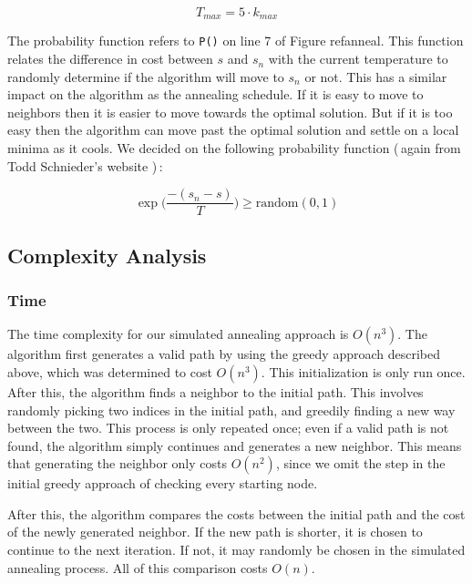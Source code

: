 \documentclass{article}
\def\code#1{\texttt{#1}}
\def\bigO#1{$O(#1)$}
\begin{document}
\begin{multicols}{2}
        \begin{equation}
            T_{max} = 5\cdot k_{max}
        \end{equation}

        The probability function refers to \code{P()} on line 7 of Figure ref{anneal}. This function relates the difference in cost between $s$ and $s_n$ with the current temperature to randomly determine if the algorithm will move to $s_n$ or not. This has a similar impact on the algorithm as the annealing schedule. If it is easy to move to neighbors then it is easier to move towards the optimal solution. But if it is too easy then the algorithm can move past the optimal solution and settle on a local minima as it cools. We decided on the following probability function (\,again from Todd Schnieder's website \cite{tspWeb})\,:

        \begin{equation}
            \exp{\Big(\frac{-(s_n - s)}{T}\Big)} \ge \text{random}(0,1)
        \end{equation}

        \subsection{Complexity Analysis}
        \subsubsection{Time}

        The time complexity for our simulated annealing approach is \bigO{n^3}. The algorithm first generates a valid path by using the greedy approach described above, which was determined to cost \bigO{n^3}. This initialization is only run once. After this, the algorithm finds a neighbor to the initial path. This involves randomly picking two indices in the initial path, and greedily finding a new way between the two. This process is only repeated once; even if a valid path is not found, the algorithm simply continues and generates a new neighbor. This means that generating the neighbor only costs \bigO{n^2}, since we omit the step in the initial greedy approach of checking every starting node. 
        
        After this, the algorithm compares the costs between the initial path and the cost of the newly generated neighbor. If the new path is shorter, it is chosen to continue to the next iteration. If not, it may randomly be chosen in the simulated annealing process. All of this comparison costs \bigO{n}. 
        

\end{multicols}
\end{document}
